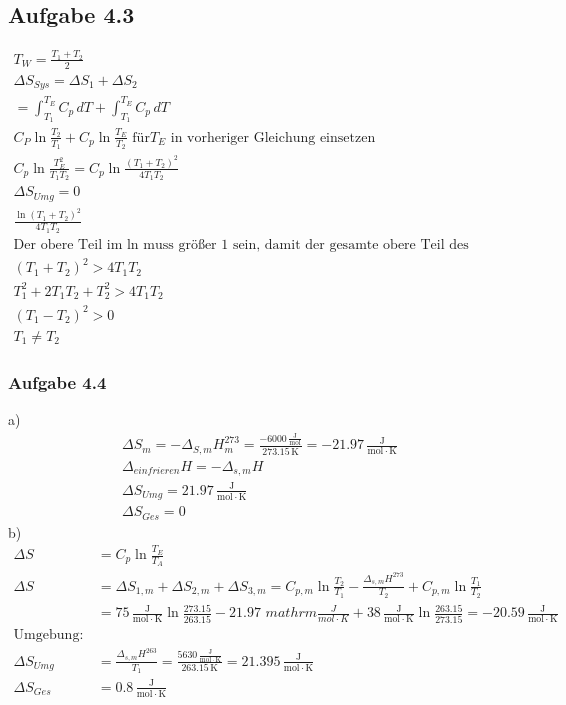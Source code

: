 \documentclass{article}
\begin{document}
\subsection*{Aufgabe 4.3}
\begin{eqnarray*}
    T_W =\frac{T_1+T_2}{2}\\
    \Delta S_{Sys} = \Delta S_1 + \Delta S_2\\
    = \int_{T_1}^{T_E}C_p\,dT + \int_{T_1}^{T_E}C_p\,dT\\
    C_P\ln\frac{T_2}{T_1}+C_p\ln\frac{T_E}{T_2} \text{ für} T_E \text{ in vorheriger Gleichung einsetzen}\\
    C_p\ln\frac{T_E^2}{T_1T_2}=C_p\ln\frac{\left(T_1+T_2\right)^2}{4T_1T_2}\\
    \Delta S_{Umg} = 0\\
    \frac{\ln\left(T_1 + T_2\right)^2}{4T_1T_2}\\\text{Der obere Teil im ln muss größer 1 sein, damit der gesamte obere Teil des Bruches größer als 1 wird}\\
    (T_1 + T_2)^2 > 4T_1T_2\\
    T_1^2+2T_1T_2+T_2^2 > 4T_1T_2\\
    (T_1 - T_2)^2 > 0\\
    T_1 \neq T_2
\end{eqnarray*}

\subsubsection*{Aufgabe 4.4}
a)\begin{eqnarray*}
    \Delta S_m = -\Delta_{S,m} H_m^{273}=\frac{-6000\,\mathrm{\frac{J}{mol}}}{273.15\,\mathrm{K}}=-21.97\,\mathrm{\frac{J}{mol\cdot K}}\\
    \Delta_{einfrieren}H = -\Delta_{s,m}H\\
    \Delta S_{Umg} = 21.97\,\mathrm{\frac{J}{mol\cdot K}}\\
    \Delta S_{Ges} = 0
\end{eqnarray*}
b)\begin{align*}
    \Delta S &=C_p\ln\frac{T_E}{T_A}\\
    \Delta S &= \Delta S_{1,m} + \Delta S_{2,m} + \Delta S_{3,m} = C_{p,m}\ln\frac{T_2}{T_1}-\frac{\Delta_{s,m}H^{273}}{T_2}+C_{p,m}\ln\frac{T_1}{T_2}\\
    &=75\,\mathrm{\frac{J}{mol\cdot K}}\ln\frac{273.15}{263.15}-21.97\,\,mathrm{\frac{J}{mol\cdot K}}+38\,\mathrm{\frac{J}{mol\cdot K}}\ln\frac{263.15}{273.15}=-20.59\,\mathrm{\frac{J}{mol\cdot K}}\\
    \mathrm{Umgebung}:\\
    \Delta S_{Umg} &= \frac{\Delta_{s,m} H ^{263}}{T_1} = \frac{5630\,\mathrm{\frac{J}{mol\cdot K}}}{263.15\,\mathrm{K}}=21.395\,\mathrm{\frac{J}{mol\cdot K}}\\
    \Delta S_{Ges} &= 0.8\,\mathrm{\frac{J}{mol\cdot K}}
\end{align*}
\end{document}
